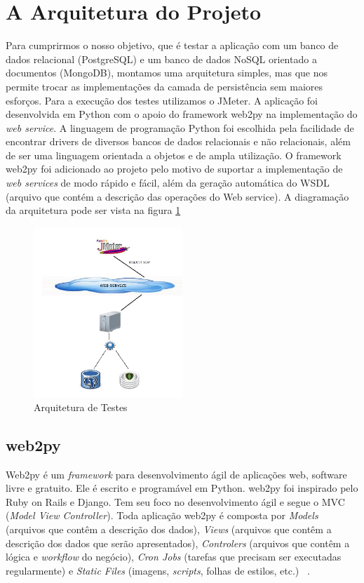 \section{A Arquitetura do Projeto}

Para cumprirmos o nosso objetivo, que é testar a aplicação com um banco de dados relacional (PostgreSQL) e um banco de dados NoSQL orientado a documentos (MongoDB), montamos uma arquitetura simples, mas que nos permite trocar as implementações da camada de persistência sem maiores esforços. Para a execução dos testes utilizamos o JMeter. A aplicação foi desenvolvida em Python com o apoio do framework web2py na implementação do \textit{web service}. A linguagem de programação Python foi escolhida pela facilidade de encontrar drivers de diversos bancos de dados relacionais e não relacionais, além de ser uma linguagem orientada a objetos e de ampla utilização. O framework web2py foi adicionado ao projeto pelo motivo de suportar a implementação de \textit{web services} de modo rápido e fácil, além da geração automática do WSDL (arquivo que contém a descrição das operações do Web service). A diagramação da arquitetura pode ser vista na figura \ref{fig:arquitetura}

	\begin{figure}[!htbp]
		\begin{center}
			\includegraphics[width=0.5\textwidth]{arquitetura}
		\end{center}
		\caption{Arquitetura de Testes}
		\label{fig:arquitetura}
	\end{figure}

\subsection{web2py}

Web2py é um \textit{framework} para desenvolvimento ágil de aplicações web, software livre e gratuito. Ele é escrito e programável em Python. web2py foi inspirado pelo Ruby on Rails e Django. Tem seu foco no desenvolvimento ágil e segue o MVC (\textit{Model View Controller}). Toda aplicação web2py é composta por \textit{Models} (arquivos que contêm a descrição dos dados), \textit{Views} (arquivos que contêm a descrição dos dados que serão apresentados), \textit{Controlers} (arquivos que contêm a lógica e \textit{workflow} do negócio), \textit{Cron Jobs} (tarefas que precisam ser executadas regularmente) e \textit{Static Files} (imagens, \textit{scripts}, folhas de estilos, etc.) ~\cite{siteweb2py}.

